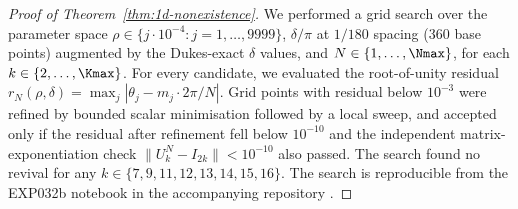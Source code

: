 \begin{proof}[Proof of Theorem~\ref{thm:1d-nonexistence}]
We performed a grid search over the parameter space
$\rho \in \{j \cdot 10^{-4} : j = 1, \ldots, 9999\}$,
$\delta/\pi$ at $1/180$ spacing (360 base points) augmented by
the Dukes-exact $\delta$ values, and $N \in \{1,
\ldots, \Nmax\}$, for each $k \in \{2, \ldots, \Kmax\}$.
For every candidate, we evaluated the root-of-unity residual
$r_N(\rho, \delta) = \max_j |\theta_j - m_j \cdot 2\pi/N|$.
Grid points with residual below $10^{-3}$ were refined by
bounded scalar minimisation followed by a local sweep, and
accepted only if the residual after refinement fell below
$10^{-10}$ and the independent matrix-exponentiation check
$\|U_k^N - I_{2k}\| < 10^{-10}$ also passed. The search
found no revival for any $k \in \{7, 9, 11, 12, 13, 14, 15, 16\}$.
The search is reproducible from the EXP032b notebook in the
accompanying repository \cite{full_revivals_references}.
\end{proof}
